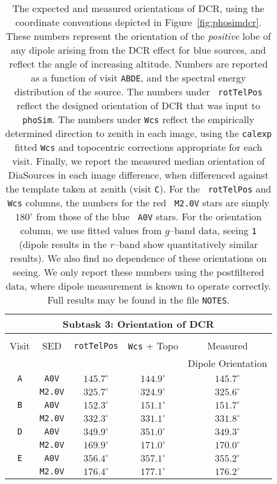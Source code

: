 \documentclass[prd, nofootinbib, floatfix, 11pt, tightenlines, times]{article}
\def\A{{\tt A}}
\def\B{{\tt B}}
\def\C{{\tt C}}
\def\D{{\tt D}}
\def\E{{\tt E}}
\begin{document}
\begin{table}
\centering
\begin{tabular}{ccccc}
\hline
\multicolumn{5}{|c|}{Subtask 3: Orientation of DCR} \\ \hline \\
Visit    & SED & {\tt rotTelPos} & {\tt Wcs} + Topo & Measured \\
         &     &                 &                  & Dipole Orientation \\
\hline
\A & {\tt A0V}   & $145.7^{\circ}$ & $144.9^{\circ}$ & $145.7^{\circ}$    \\
   & {\tt M2.0V} & $325.7^{\circ}$ & $324.9^{\circ}$ & $325.6^{\circ}$    \\
\hline
\B & {\tt A0V}   & $152.3^{\circ}$ & $151.1^{\circ}$ & $151.7^{\circ}$    \\
   & {\tt M2.0V} & $332.3^{\circ}$ & $331.1^{\circ}$ & $331.8^{\circ}$    \\
\hline
\D & {\tt A0V}   & $349.9^{\circ}$ & $351.0^{\circ}$ & $349.3^{\circ}$    \\
   & {\tt M2.0V} & $169.9^{\circ}$ & $171.0^{\circ}$ & $170.0^{\circ}$    \\
\hline
\E & {\tt A0V}   & $356.4^{\circ}$ & $357.1^{\circ}$ & $355.2^{\circ}$    \\
   & {\tt M2.0V} & $176.4^{\circ}$ & $177.1^{\circ}$ & $176.2^{\circ}$    \\
\end{tabular}
\caption[So I can have 2 paragraphs]{The expected and measured
  orientations of DCR, using the coordinate conventions depicted in
  Figure~\ref{fig:phosimdcr}.  These numbers represent the orientation
  of the {\it positive} lobe of any dipole arising from the DCR effect
  for blue sources, and reflect the angle of increasing altitude.
  Numbers are reported as a function of visit \A\B\D\E, and the
  spectral energy distribution of the source.  The numbers under {\tt
    rotTelPos} reflect the designed orientation of DCR that was input
  to {\tt phoSim}.  The numbers under {\tt Wcs} reflect the
  empirically determined direction to zenith in each image, using the
  {\tt calexp} fitted {\tt Wcs} and topocentric corrections
  appropriate for each visit.  Finally, we report the measured median
  orientation of DiaSources in each image difference, when differenced
  against the template taken at zenith (visit \C).  For the {\tt
    rotTelPos} and {\tt Wcs} columns, the numbers for the red {\tt
    M2.0V} stars are simply $180^{\circ}$ from those of the blue {\tt
    A0V} stars.  For the orientation column, we use fitted values from
  $g$--band data, seeing {\tt 1} (dipole results in the $r$--band show
  quantitatively similar results).  We also find no dependence of
  these orientations on seeing.  We only report these numbers using
  the postfiltered data, where dipole measurement is known to operate
  correctly.  Full results may be found in the file {\tt NOTES}.}
\label{tab:dcrang}
\end{table}
\end{document}
